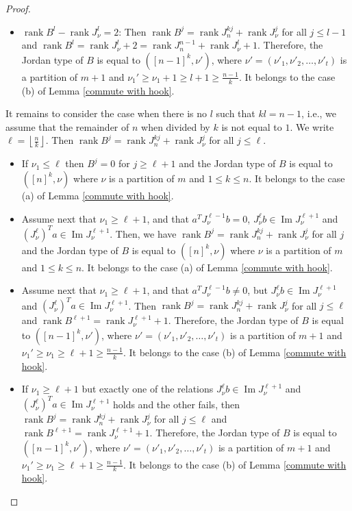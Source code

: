 \documentclass[10pt,a4paper]{amsart}
\DeclareMathOperator{\im}{Im}
\DeclareMathOperator{\rank}{rank}
\begin{document}
\begin{proof}
\begin{itemize}
\item[(iii)] $\rank B^l-\rank J_{\nu}^l=2$: Then $\rank B^j=\rank J_n^{kj}+\rank J_{\nu}^j $ for all $j\leq l-1$ and $\rank B^l=\rank J_{\nu}^l+2=\rank J_n^{n-1}+\rank J_{\nu}^l+1$. Therefore, the Jordan type of $B$ is equal to $([n-1]^k,\nu')$, where $\nu'=(\nu'_1,\nu'_2,\ldots,\nu'_t)$ is a partition of $m+1$ and $\nu_1'\ge\nu_1+1\ge l+1\ge \frac{n-1}{k} $. It belongs to the case (b) of Lemma \ref{commute with hook}.

\end{itemize}

It remains to consider the case when there is no $l$ such that $kl=n-1$, i.e., we assume that the remainder of $n$ when divided by $k$ is not equal to $1$. We write $\ell=\left\lfloor{\frac{n}{k}}\right\rfloor$. Then 
$\rank B^j=\rank J_n^{kj}+\rank J_{\nu}^j $ for all $j\leq \ell$. 

\begin{itemize}
    \item[(i)] If $\nu_1\leq\ell$ then $B^j=0$ for $j\ge\ell +1$ and the Jordan type of $B$ is equal to $\left([n]^k,\nu\right)$ where $\nu$ is a partition of $m$ and $1\leq k\leq n$. It belongs to the case (a) of Lemma \ref{commute with hook}.

\item[(ii)] Assume next that $\nu_1\ge\ell+1$, and that $a^TJ_{\nu}^{\ell-1}b=0 $, $J_{\nu}^{\ell}b\in\im J_{\nu}^{\ell +1} $ and $\left(J_{\nu}^{\ell}\right)^Ta\in\im J_{\nu}^{\ell +1} $. Then, we have $\rank B^j=\rank J_n^{kj}+\rank J_{\nu}^j$  for all $j$ and the Jordan type of $B$ is equal to $\left([n]^k,\nu\right)$ where $\nu$ is a partition of $m$ and $1\leq k\leq n$. It belongs to the case (a) of Lemma \ref{commute with hook}.

\item[(iii)] Assume next that $\nu_1\ge\ell+1$, and that $a^TJ_{\nu}^{\ell-1}b\neq 0 $, but $J_{\nu}^{\ell}b\in\im J_{\nu}^{\ell+1}$ and $\left(J_{\nu}^{\ell}\right)^Ta\in\im J_{\nu}^{\ell+1}  $. Then $\rank B^j=\rank J_n^{kj}+\rank J_{\nu}^j $ for all $j\leq \ell$ and $\rank B^{\ell +1} =\rank J_{\nu}^{\ell +1} +1$. Therefore, the Jordan type of $B$ is equal to $([n-1]^k,\nu')$, where $\nu'=(\nu'_1,\nu'_2,\ldots,\nu'_t)$ is a partition of $m+1$ and $\nu_1'\ge\nu_1\ge \ell+1\ge \frac{n-1}{k} $. It belongs to the case (b) of Lemma \ref{commute with hook}.

\item[(iv)] If $\nu_1\ge\ell + 1$ but exactly one of the relations $J_{\nu}^{\ell}b\in\im J_{\nu}^{\ell +1}$ and $\left(J_{\nu}^{\ell}\right)^Ta\in\im J_{\nu}^{\ell +1} $ holds and the other fails, then $\rank B^j=\rank J_n^{kj}+\rank J_{\nu}^j $ for all $j\leq \ell$ and $\rank B^{\ell +1} =\rank J_{\nu}^{\ell +1} +1$. Therefore, the Jordan type of $B$ is equal to $([n-1]^k,\nu')$, where $\nu'=(\nu'_1,\nu'_2,\ldots,\nu'_t)$ is a partition of $m+1$ and $\nu_1'\ge\nu_1\ge \ell+1\ge \frac{n-1}{k} $. It belongs to the case (b) of Lemma \ref{commute with hook}.


\end{itemize}
\end{proof}
\end{document}
